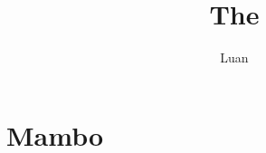 \documentclass[11pt, a4paper]{article}
\title{The}
\author{Luan}
\begin{document}
\maketitle

\chapter{Mambo}
\end{document}
